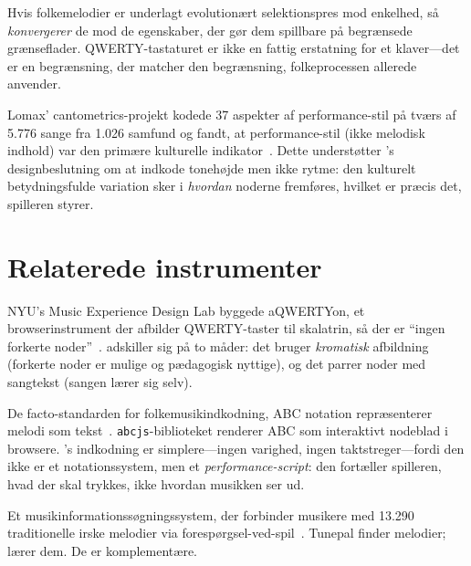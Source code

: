 \documentclass[11pt]{article}
\begin{document}
\begin{card}

Hvis folkemelodier er underlagt evolutionært selektionspres mod enkelhed, så \emph{konvergerer} de mod de egenskaber, der gør dem spillbare på begrænsede grænseflader. QWERTY-tastaturet er ikke en fattig erstatning for et klaver---det er en begrænsning, der matcher den begrænsning, folkeprocessen allerede anvender.
\end{card}

Lomax' cantometrics-projekt kodede 37 aspekter af performance-stil på tværs af 5.776 sange fra 1.026 samfund og fandt, at performance-stil (ikke melodisk indhold) var den primære kulturelle indikator~\citep{lomax1968folk}. Dette understøtter \np{}'s designbeslutning om at indkode tonehøjde men ikke rytme: den kulturelt betydningsfulde variation sker i \emph{hvordan} noderne fremføres, hvilket er præcis det, spilleren styrer.

\section{Relaterede instrumenter}

\begin{card}
NYU's Music Experience Design Lab byggede aQWERTYon, et browserinstrument der afbilder QWERTY-taster til skalatrin, så der er ``ingen forkerte noder''~\citep{hein2017aqwertyon}. \np{} adskiller sig på to måder: det bruger \emph{kromatisk} afbildning (forkerte noder er mulige og pædagogisk nyttige), og det parrer noder med sangtekst (sangen lærer sig selv).
\end{card}

\begin{card}
De facto-standarden for folkemusikindkodning, ABC notation repræsenterer melodi som tekst~\citep{walshaw2011abc}. \texttt{abcjs}-biblioteket renderer ABC som interaktivt nodeblad i browsere. \np{}'s indkodning er simplere---ingen varighed, ingen taktstreger---fordi den ikke er et notationssystem, men et \emph{performance-script}: den fortæller spilleren, hvad der skal trykkes, ikke hvordan musikken ser ud.
\end{card}

\begin{card}
Et musikinformationssøgningssystem, der forbinder musikere med 13.290 traditionelle irske melodier via forespørgsel-ved-spil~\citep{duggan2009tunepal}. Tunepal finder melodier; \np{} lærer dem. De er komplementære.
\end{card}
\end{document}
